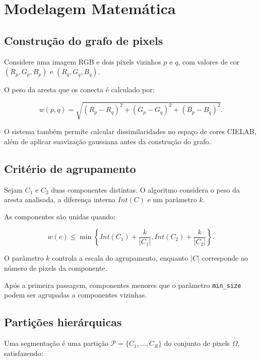 \documentclass[12pt]{article}
\begin{document}
\section{Modelagem Matemática}
\label{sec:modelagem}

\subsection{Construção do grafo de pixels}

Considere uma imagem RGB e dois pixels vizinhos
$p$ e $q$, com valores de cor
$(R_p,G_p,B_p)$ e $(R_q,G_q,B_q)$.

O peso da aresta que os conecta é calculado por:

\begin{equation}
w(p,q)=\sqrt{
(R_p-R_q)^2+
(G_p-G_q)^2+
(B_p-B_q)^2
}.
\label{eq:pesos}
\end{equation}

O sistema também permite calcular dissimilaridades
no espaço de cores CIELAB, além de aplicar suavização
gaussiana antes da construção do grafo.

\subsection{Critério de agrupamento}

Sejam $C_1$ e $C_2$ duas componentes distintas.
O algoritmo considera o peso da aresta analisada,
a diferença interna $Int(C)$ e um parâmetro $k$.

As componentes são unidas quando:

\begin{equation}
w(e)\leq
\min\left\{
Int(C_1)+\frac{k}{|C_1|},
Int(C_2)+\frac{k}{|C_2|}
\right\}.
\label{eq:criterio}
\end{equation}

O parâmetro $k$ controla a escala do agrupamento,
enquanto $|C|$ corresponde ao número de pixels
da componente.

Após a primeira passagem, componentes menores
que o parâmetro \texttt{min\_size} podem ser
agrupadas a componentes vizinhas.

\subsection{Partições hierárquicas}

Uma segmentação é uma partição
$\mathcal{P}=\{C_1,\ldots,C_R\}$ do conjunto
de pixels $\Omega$, satisfazendo:
\end{document}

